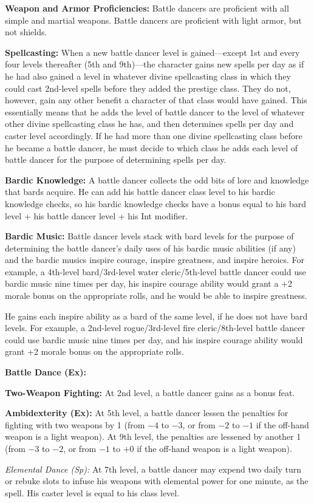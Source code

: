 {
\textbf{Weapon and Armor Proficiencies:} Battle dancers are proficient with all simple and martial weapons. Battle dancers are proficient with light armor, but not shields.

\textbf{Spellcasting:} When a new battle dancer level is gained---except 1st and every four levels thereafter (5th and 9th)---the character gains new spells per day as if he had also gained a level in whatever divine spellcasting class in which they could cast 2nd-level spells before they added the prestige class. They do not, however, gain any other benefit a character of that class would have gained. This essentially means that he adds the level of battle dancer to the level of whatever other divine spellcasting class he has, and then determines spells per day and caster level accordingly. If he had more than one divine spellcasting class before he became a battle dancer, he must decide to which class he adds each level of battle dancer for the purpose of determining spells per day.

\textbf{Bardic Knowledge:} A battle dancer collects the odd bits of lore and knowledge that bards acquire. He can add his battle dancer class level to his bardic knowledge checks, so his bardic knowledge checks have a bonus equal to his bard level + his battle dancer level + his Int modifier.

\textbf{Bardic Music:} Battle dancer levels stack with bard levels for the purpose of determining the battle dancer's daily uses of his bardic music abilities (if any) and the bardic musics inspire courage, inspire greatness, and inspire heroics. For example, a 4th-level bard/3rd-level water cleric/5th-level battle dancer could use bardic music nine times per day, his inspire courage ability would grant a +2 morale bonus on the appropriate rolls, and he would be able to inspire greatness.

He gains each inspire ability as a bard of the same level, if he does not have bard levels. For example, a 2nd-level rogue/3rd-level fire cleric/8th-level battle dancer could use bardic music nine times per day, and his inspire courage ability would grant +2 morale bonus on the appropriate rolls.

\textbf{Battle Dance (Ex):}

\textbf{Two-Weapon Fighting:} At 2nd level, a battle dancer gains  as a bonus feat.

\textbf{Ambidexterity (Ex):} At 5th level, a battle dancer lessen the penalties for fighting with two weapons by 1 (from $-4$ to $-3$, or from $-2$ to $-1$ if the off-hand weapon is a light weapon). At 9th level, the penalties are lessened by another 1 (from $-3$ to $-2$, or from $-1$ to $+0$ if the off-hand weapon is a light weapon).

\textit{Elemental Dance (Sp):} At 7th level, a battle dancer may expend two daily turn or rebuke slots to infuse his weapons with elemental power for one minute, as the  spell. His caster level is equal to his class level.

}